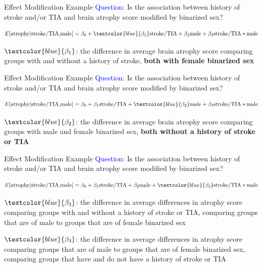\documentclass[10pt,t]{beamer}
\begin{document}
\begin{frame}{Effect Modification Example}
	\textcolor{blue}{Question:} Is the association between history of stroke and/or TIA and brain atrophy score modified by binarized sex?
	
	\medskip
	\small
	\[E[\text{atrophy}|\text{stroke/TIA,male}]=\beta_0+\textcolor{blue}{\beta_1}\text{stroke/TIA}+\beta_2\text{male}+\beta_3\text{stroke/TIA}*\text{male}\]
	
	\normalsize
	$\textcolor{blue}{\beta_1}$: the difference in average brain atrophy score comparing groups with and without a history of stroke, \textbf{both with female binarized sex}
	
	
	
\end{frame}

\begin{frame}{Effect Modification Example}
	\textcolor{blue}{Question:} Is the association between history of stroke and/or TIA and brain atrophy score modified by binarized sex?
	
	\medskip
	\small
	\[E[\text{atrophy}|\text{stroke/TIA,male}]=\beta_0+\beta_1\text{stroke/TIA}+\textcolor{blue}{\beta_2}\text{male}+\beta_3\text{stroke/TIA}*\text{male}\]
	
	\normalsize
	$\textcolor{blue}{\beta_2}$: the difference in average brain atrophy score comparing groups with male and female binarized sex, \textbf{both without a history of stroke or TIA}
	
	
	
\end{frame}

\begin{frame}{Effect Modification Example}
	\textcolor{blue}{Question:} Is the association between history of stroke and/or TIA and brain atrophy score modified by binarized sex?
	
	\medskip
	\small
	\[E[\text{atrophy}|\text{stroke/TIA,male}]=\beta_0+\beta_1\text{stroke/TIA}+\beta_2\text{male}+\textcolor{blue}{\beta_3}\text{stroke/TIA}*\text{male}\]
	
	\normalsize
	$\textcolor{blue}{\beta_3}$: the difference in average differences in atrophy score comparing groups with and without a history of stroke or TIA, comparing groups that are of male to groups that are of female binarized sex\pause 
	
	\medskip
	
	$\textcolor{blue}{\beta_3}$: the difference in average differences in atrophy score comparing groups that are of male to groups that are of female binarized sex, comparing groups that have and do not have a history of stroke or TIA
	
\end{frame}
\end{document}
